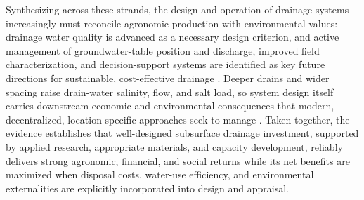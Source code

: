 Synthesizing across these strands, the design and operation of drainage systems increasingly must reconcile agronomic production with environmental values: drainage water quality is advanced as a necessary design criterion, and active management of groundwater-table position and discharge, improved field characterization, and decision-support systems are identified as key future directions for sustainable, cost-effective drainage \parencite{Ayars2015}. Deeper drains and wider spacing raise drain-water salinity, flow, and salt load, so system design itself carries downstream economic and environmental consequences that modern, decentralized, location-specific approaches seek to manage \parencite{Yannopoulos2020,Ritzema2023}. Taken together, the evidence establishes that well-designed subsurface drainage investment, supported by applied research, appropriate materials, and capacity development, reliably delivers strong agronomic, financial, and social returns while its net benefits are maximized when disposal costs, water-use efficiency, and environmental externalities are explicitly incorporated into design and appraisal.